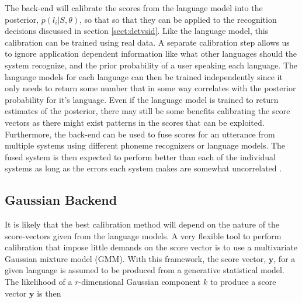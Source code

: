 The back-end will calibrate the scores from the language model into the posterior, $p(l_i | S, \theta)$, so that so that they can be applied to the recognition decisions discussed in section \ref{sect:detvsid}. Like the language model, this calibration can be trained using real data. A separate calibration step allows us to ignore application dependent information like what other languages should the system recognize, and the prior probability of a user speaking each language. The language models for each language can then be trained independently since it only needs to return some number that in some way correlates with the posterior probability for it's language. Even if the language model is trained to return estimates of the posterior, there may still be some benefits calibrating the score vectors \cite[820]{lidbok} as there might exist patterns in the scores that can be exploited. Furthermore, the back-end can be used to fuse scores for an utterance from multiple systems using different phoneme recognizers or language models. The fused system is then expected to perform better than each of the individual systems as long as the errors each system makes are somewhat uncorrelated \cite[818]{lidbok}.

\subsection{Gaussian Backend}
\label{sect:gmmscore}

It is likely that the best calibration method will depend on the nature of the score-vectors given from the language models. A very flexible tool to perform calibration that impose little demands on the score vector is to use a multivariate Gaussian mixture model (GMM). With this framework, the score vector, $\mathbf{y}$, for a given language is assumed to be produced from a generative statistical model. The likelihood of a $r$-dimensional Gaussian component $k$ to produce a score vector $\mathbf{y}$ is then


